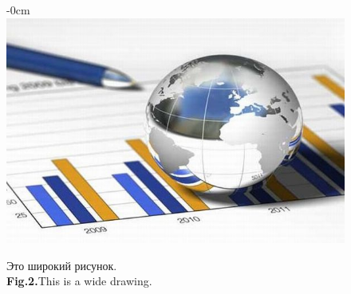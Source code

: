 \documentclass[i-edu.uz,journal,article,submit,pdftex,moreauthors]{Definitions/i-edu.uz}
\begin{document}
\begin{sloppypar}
{%
\begin{figure}[H]
\begin{adjustwidth}{-\extralength}{0cm}
\centering
\includegraphics[width=15.5cm]{issledovania.jpg}
\end{adjustwidth}
\caption{Это широкий рисунок.\label{fig2}\\
\textbf{Fig.2.}This is a wide drawing.\label{fig2}}
\end{figure}  

}
\end{sloppypar}
\end{document}

